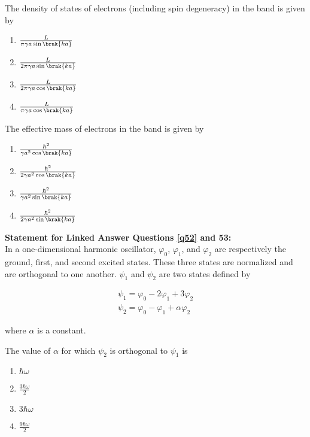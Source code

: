 \item \label{q50} The density of states of electrons (including spin degeneracy) in the band is given by
\begin{multicols}{4}
    \begin{enumerate}
        \item $\frac{L}{\pi \gamma a \sin\brak{ka}}$
        \item $\frac{L}{2\pi \gamma a \sin\brak{ka}}$
        \item $\frac{L}{2\pi \gamma a \cos\brak{ka}}$
        \item $\frac{L}{\pi \gamma a \cos\brak{ka}}$
    \end{enumerate}
\end{multicols}

\item \label{q51} The effective mass of electrons in the band is given by
\begin{multicols}{4}
    \begin{enumerate}
        \item $\frac{\hbar^2}{\gamma a^2 \cos\brak{ka}}$
        \item $\frac{\hbar^2}{2\gamma a^2 \cos\brak{ka}}$
        \item $\frac{\hbar^2}{\gamma a^2 \sin\brak{ka}}$
        \item $\frac{\hbar^2}{2\gamma a^2 \sin\brak{ka}}$
    \end{enumerate}
\end{multicols}

\textbf{Statement for Linked Answer Questions \ref{q52} and 53:} \\
In a one-dimensional harmonic oscillator, $\varphi_0$, $\varphi_1$, and $\varphi_2$ are respectively the
ground, first, and second excited states. These three states are normalized and are orthogonal to one another.
$\psi_1$ and $\psi_2$ are two states defined by

\begin{align*}
\psi_1 = \varphi_0 - 2\varphi_1 + 3\varphi_2 \\
\psi_2 = \varphi_0 - \varphi_1 + \alpha\varphi_2
\end{align*}

where $\alpha$ is a constant.

\item \label{q52} The value of $\alpha$ for which $\psi_2$ is orthogonal to $\psi_1$ is

\begin{multicols}{4}
    \begin{enumerate}
        \item $\hbar\omega$
        \item $\frac{3\hbar\omega}{2}$
        \item $3\hbar\omega$
        \item $\frac{9\hbar\omega}{2}$
    \end{enumerate}
\end{multicols}